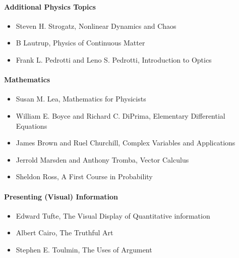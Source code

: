 \documentclass[letterpaper,10pt,english]{jupyterBook}
\begin{document}
\paragraph{Additional Physics Topics}
\label{\detokenize{content/0_course/2_design:additional-physics-topics}}\begin{itemize}
\item {} 
\sphinxAtStartPar
Steven H. Strogatz, Nonlinear Dynamics and Chaos

\item {} 
\sphinxAtStartPar
B Lautrup, Physics of Continuous Matter

\item {} 
\sphinxAtStartPar
Frank L. Pedrotti and Leno S. Pedrotti, Introduction to Optics

\end{itemize}


\paragraph{Mathematics}
\label{\detokenize{content/0_course/2_design:mathematics}}\begin{itemize}
\item {} 
\sphinxAtStartPar
Susan M. Lea, Mathematics for Physicists

\item {} 
\sphinxAtStartPar
William E. Boyce and Richard C. DiPrima, Elementary Differential Equations

\item {} 
\sphinxAtStartPar
James Brown and Ruel Churchill, Complex Variables and Applications

\item {} 
\sphinxAtStartPar
Jerrold Marsden and Anthony Tromba, Vector Calculus

\item {} 
\sphinxAtStartPar
Sheldon Ross, A First Course in Probability

\end{itemize}


\paragraph{Presenting (Visual) Information}
\label{\detokenize{content/0_course/2_design:presenting-visual-information}}\begin{itemize}
\item {} 
\sphinxAtStartPar
Edward Tufte, The Visual Display of Quantitative information

\item {} 
\sphinxAtStartPar
Albert Cairo, The Truthful Art

\item {} 
\sphinxAtStartPar
Stephen E. Toulmin, The Uses of Argument

\end{itemize}
\end{document}
